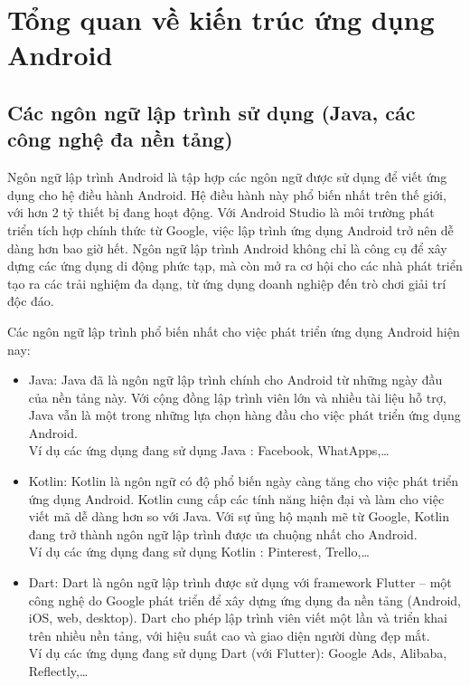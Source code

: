 
\section{Tổng quan về kiến trúc ứng dụng Android}
    \subsection{Các ngôn ngữ lập trình sử dụng (Java, các công nghệ đa nền tảng)}
    \renewcommand{\labelitemi}{--}    
    \begin{flushleft}
            \hspace*{0.8cm}Ngôn ngữ lập trình Android là tập hợp các ngôn ngữ được sử dụng để viết ứng dụng cho hệ điều hành Android. Hệ điều hành này phổ biến nhất trên thế giới, với hơn 2 tỷ thiết bị đang hoạt động. Với Android Studio là môi trường phát triển tích hợp chính thức từ Google, việc lập trình ứng dụng Android trở nên dễ dàng hơn bao giờ hết. Ngôn ngữ lập trình Android không chỉ là công cụ để xây dựng các ứng dụng di động phức tạp, mà còn mở ra cơ hội cho các nhà phát triển tạo ra các trải nghiệm đa dạng, từ ứng dụng doanh nghiệp đến trò chơi giải trí độc đáo.
    \end{flushleft}

    \begin{flushleft}
        \hspace*{0.8cm}Các ngôn ngữ lập trình phổ biến nhất cho việc phát triển ứng dụng Android hiện nay:
        \setlength{\leftmargini}{1.5cm}
        \begin{itemize}
            \item Java: Java đã là ngôn ngữ lập trình chính cho Android từ những ngày đầu của nền tảng này. Với cộng đồng lập trình viên lớn và nhiều tài liệu hỗ trợ, Java vẫn là một trong những lựa chọn hàng đầu cho việc phát triển ứng dụng Android.\\
            Ví dụ các ứng dụng đang sử dụng Java : Facebook, WhatApps,…
            \item Kotlin: Kotlin là ngôn ngữ có độ phổ biến ngày càng tăng cho việc phát triển ứng dụng Android. Kotlin cung cấp các tính năng hiện đại và làm cho việc viết mã dễ dàng hơn so với Java. Với sự ủng hộ mạnh mẽ từ Google, Kotlin đang trở thành ngôn ngữ lập trình được ưa chuộng nhất cho Android.\\
            Ví dụ các ứng dụng đang sử dụng Kotlin : Pinterest, Trello,…
            \item Dart: Dart là ngôn ngữ lập trình được sử dụng với framework Flutter – một công nghệ do Google phát triển để xây dựng ứng dụng đa nền tảng (Android, iOS, web, desktop). Dart cho phép lập trình viên viết một lần và triển khai trên nhiều nền tảng, với hiệu suất cao và giao diện người dùng đẹp mắt.\\
            Ví dụ các ứng dụng đang sử dụng Dart (với Flutter): Google Ads, Alibaba, Reflectly,…
        \end{itemize}
    \end{flushleft}

